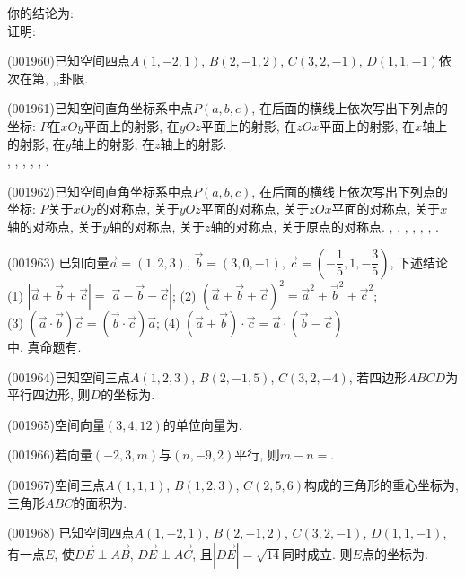 你的结论为:\\ 
证明:
\item (001960)已知空间四点$A(1,-2,1)$, $B(2,-1,2)$, $C(3,2,-1)$, $D(1,1,-1)$依次在第,
,,卦限.
\item (001961)已知空间直角坐标系中点$P(a,b,c)$, 在后面的横线上依次写出下列点的坐标:
$P$在$xOy$平面上的射影, 在$yOz$平面上的射影, 在$zOx$平面上的射影, 在$x$轴上的射影,
在$y$轴上的射影, 在$z$轴上的射影.\\ 
, , , , , .
\item (001962)已知空间直角坐标系中点$P(a,b,c)$, 在后面的横线上依次写出下列点的坐标:
$P$关于$xOy$的对称点, 关于$yOz$平面的对称点, 关于$zOx$平面的对称点, 关于$x$轴的对称点,
关于$y$轴的对称点, 关于$z$轴的对称点, 关于原点的对称点.
, , , , , , .
\item (001963)%
已知向量$\overrightarrow{a}=(1,2,3)$, $\overrightarrow{b}=(3,0,-1)$, $\overrightarrow{c}=(-\dfrac{1}{5},1,-\dfrac{3}{5})$, 下述结论\\ 
(1) $|\overrightarrow{a}+\overrightarrow{b}+\overrightarrow{c}|=|\overrightarrow{a}-\overrightarrow{b}-\overrightarrow{c}|$; (2) $(\overrightarrow{a}+\overrightarrow{b}+\overrightarrow{c})^2=\overrightarrow{a}^2+\overrightarrow{b}^2+\overrightarrow{c}^2$;\\ 
(3) $(\overrightarrow{a}\cdot\overrightarrow{b})\overrightarrow{c}=(\overrightarrow{b}\cdot \overrightarrow{c})\overrightarrow{a}$; (4) $(\overrightarrow{a}+\overrightarrow{b})\cdot \overrightarrow{c}=\overrightarrow{a}\cdot (\overrightarrow{b}-\overrightarrow{c})$\\ 
中, 真命题有.
\item (001964)已知空间三点$A(1,2,3)$, $B(2,-1,5)$, $C(3,2,-4)$, 若四边形$ABCD$为平行四边形, 则$D$的坐标为.
\item (001965)空间向量$(3,4,12)$的单位向量为.
\item (001966)若向量$(-2,3,m)$与$(n,-9,2)$平行, 则$m-n=$.
\item (001967)空间三点$A(1,1,1)$, $B(1,2,3)$, $C(2,5,6)$构成的三角形的重心坐标为, 三角形$ABC$的面积为.
\item (001968)%
已知空间四点$A(1,-2,1)$, $B(2,-1,2)$, $C(3,2,-1)$, $D(1,1,-1)$, 有一点$E$, 使$\overrightarrow{DE}\perp \overrightarrow
{AB}$, $\overrightarrow{DE}\perp \overrightarrow{AC}$, 且$|\overrightarrow{DE}|=\sqrt{14}$同时成立. 则$E$点的坐标为.
